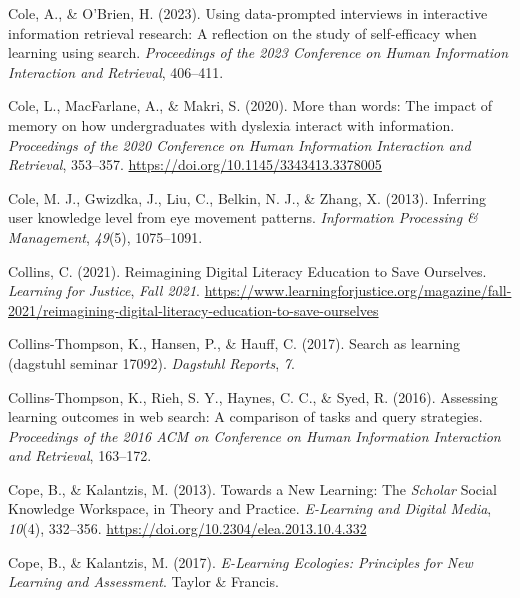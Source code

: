 \documentclass[letterpaper, nobind]{templates/ociamthesis}
\newlength{\cslhangindent}
\newenvironment{CSLReferences}[2] %
 {%
  \setlength{\parindent}{0pt}
  \ifodd #1
  \let\oldpar\par
  \def\par{\hangindent=\cslhangindent\oldpar}
  \fi
  \setlength{\parskip}{1mm}
  \setlength{\baselineskip}{6mm}
 }%
 {}
\begin{document}
\begin{CSLReferences}{1}{0}
\leavevmode{}%
Cole, A., \& O'Brien, H. (2023). Using data-prompted interviews in interactive information retrieval research: A reflection on the study of self-efficacy when learning using search. \emph{Proceedings of the 2023 Conference on Human Information Interaction and Retrieval}, 406--411.

\leavevmode{}%
Cole, L., MacFarlane, A., \& Makri, S. (2020). More than words: The impact of memory on how undergraduates with dyslexia interact with information. \emph{Proceedings of the 2020 Conference on Human Information Interaction and Retrieval}, 353--357. \url{https://doi.org/10.1145/3343413.3378005}

\leavevmode{}%
Cole, M. J., Gwizdka, J., Liu, C., Belkin, N. J., \& Zhang, X. (2013). Inferring user knowledge level from eye movement patterns. \emph{Information Processing \& Management}, \emph{49}(5), 1075--1091.

\leavevmode{}%
Collins, C. (2021). Reimagining {Digital Literacy Education} to {Save Ourselves}. \emph{Learning for Justice}, \emph{Fall 2021}. \url{https://www.learningforjustice.org/magazine/fall-2021/reimagining-digital-literacy-education-to-save-ourselves}

\leavevmode{}%
Collins-Thompson, K., Hansen, P., \& Hauff, C. (2017). Search as learning (dagstuhl seminar 17092). \emph{Dagstuhl Reports}, \emph{7}.

\leavevmode{}%
Collins-Thompson, K., Rieh, S. Y., Haynes, C. C., \& Syed, R. (2016). Assessing learning outcomes in web search: A comparison of tasks and query strategies. \emph{Proceedings of the 2016 ACM on Conference on Human Information Interaction and Retrieval}, 163--172.

\leavevmode{}%
Cope, B., \& Kalantzis, M. (2013). Towards a {New Learning}: The {\emph{Scholar}} {Social Knowledge Workspace}, in {Theory} and {Practice}. \emph{E-Learning and Digital Media}, \emph{10}(4), 332--356. \url{https://doi.org/10.2304/elea.2013.10.4.332}

\leavevmode{}%
Cope, B., \& Kalantzis, M. (2017). \emph{E-{Learning Ecologies}: Principles for {New Learning} and {Assessment}}. {Taylor \& Francis}.


\end{CSLReferences}
\end{document}
